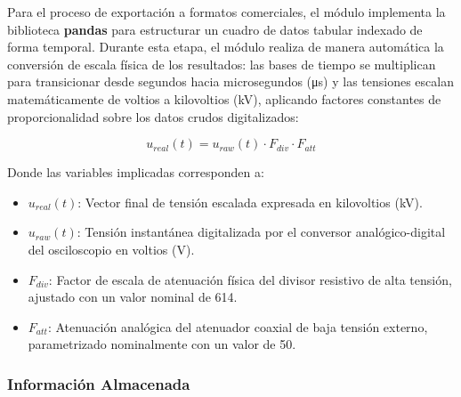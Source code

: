 Para el proceso de exportación a formatos comerciales, el módulo implementa la biblioteca \textbf{pandas} para estructurar un cuadro de datos tabular indexado de forma temporal. Durante esta etapa, el módulo realiza de manera automática la conversión de escala física de los resultados: las bases de tiempo se multiplican para transicionar desde segundos hacia microsegundos (\unit{\micro\second}) y las tensiones escalan matemáticamente de voltios a kilovoltios (\unit{\kilo\volt}), aplicando factores constantes de proporcionalidad sobre los datos crudos digitalizados:

\begin{equation}
\label{eq:atenuacion_escalado}
u_{real}(t) = u_{raw}(t) \cdot F_{div} \cdot F_{att}
\end{equation}

Donde las variables implicadas corresponden a:
\begin{itemize}
    \item $u_{real}(t)$: Vector final de tensión escalada expresada en kilovoltios (\unit{\kilo\volt}).
    \item $u_{raw}(t)$: Tensión instantánea digitalizada por el conversor analógico-digital del osciloscopio en voltios (\unit{\volt}).
    \item $F_{div}$: Factor de escala de atenuación física del divisor resistivo de alta tensión, ajustado con un valor nominal de \num{614}.
    \item $F_{att}$: Atenuación analógica del atenuador coaxial de baja tensión externo, parametrizado nominalmente con un valor de \num{50}.
\end{itemize}

\subsubsection{Información Almacenada}
\label{subsubsec:informacion_almacenada}

